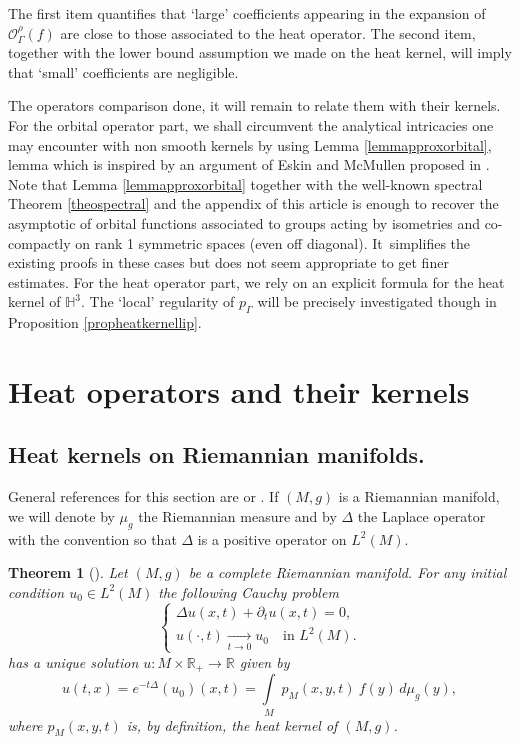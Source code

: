 \documentclass[10pt]{amsart}
\let\mathcal\mathscr
\theoremstyle{plain}
\newtheorem{theoreme}[equation]{Theorem}
\theoremstyle{definition}
\newcommand{\HH}{\mathbb{H}}
\newcommand{\RR}{\mathbb{R}}
\newcommand{\inte}[1]{\underset{#1}{\int}}
\newcommand{\tends}[1]{\underset{#1}{\longrightarrow}}
\begin{document}
The first item quantifies that `large' coefficients appearing in the expansion of $\mathcal{O}^{\rho}_{\Gamma}(f)$ are close to those associated to the heat operator. The second item, together with the lower bound assumption we made on the heat kernel, will imply that `small' coefficients are negligible.

The operators comparison done, it will remain to relate them with their kernels. For the orbital operator part, we shall circumvent the analytical intricacies one may encounter with non smooth kernels by using Lemma \ref{lemmapproxorbital}, lemma which is inspired by an argument of Eskin and McMullen proposed in \cite{arteskinmac}. Note that Lemma \ref{lemmapproxorbital} together with the well-known spectral Theorem \ref{theospectral} and the appendix of this article is enough to recover the asymptotic of orbital functions associated to groups acting by isometries and co-compactly on rank 1 symmetric spaces (even off diagonal). It~simplifies the existing proofs in these cases but does not seem appropriate to get finer estimates. For the heat operator part, we rely on an explicit formula for the heat kernel of $\HH^3$. The `local' regularity of $p_{\Gamma}$ will be precisely investigated though in Proposition \ref{propheatkernellip}.

\section{Heat operators and their kernels}

\label{secheatoperator}

\subsection{Heat kernels on Riemannian manifolds.} General references for this section are \cite{livrechavel} or \cite{bookgrigorheatkernel}. If $(M,g)$ is a Riemannian manifold, we will denote by $\mu_g$ the Riemannian measure and by $\Delta$ the Laplace operator with the convention so that $\Delta$ is a positive operator on $L^2(M)$.

\begin{theoreme}[{\cite[Cor.\,4.11, p.\,117]{bookgrigorheatkernel}}]
\label{theocauchyprobleml1}
Let $(M,g)$ be a complete Riemannian manifold. For any initial condition $u_0 \in L^2(M)$ the following Cauchy problem\vspace*{-3pt}
\begin{equation}
\label{eq Cauchy problem1}
\begin{cases}
\Delta u(x,t) + \partial_t u(x,t) = 0, \\
u(\cdot,t) \tends{t \to 0} u_0 \quad \text{in } L^2(M).
\end{cases}
\end{equation}
has a unique solution $u : M \times \RR_+ \to \RR$ given by\vspace*{-3pt}
\[
u(t,x) = e^{-t \Delta}(u_0)(x,t) = \inte{M} \ p_M(x,y,t) \ f(y) \,d \mu_{g}(y),
\]
where $p_M(x,y,t)$ is, by definition, the \emph{heat kernel} of $(M,g)$.
\end{theoreme}
\end{document}
